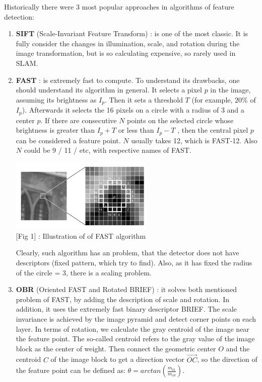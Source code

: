 Historically there were 3 most popular approaches in algorithms of feature detection:
\begin{enumerate}
    \item {\bf  SIFT} (Scale-Invariant Feature Transform) : is one of the most classic. It is fully consider the changes in illumination, scale, and rotation during the image transformation, but is so calculating expensive, so rarely used in SLAM.

    \item {\bf FAST} : is extremely fast to compute. To understand its drawbacks, one should understand its algorithm in general. It selects a  pixel $p$ in the image, assuming its brightness as $I_p$. Then it sets a threshold $T$ (for example, $20\%$ of $I_p$). Afterwards it selects the 16 pixels on a circle with a radius of 3 and a center $p$. If there are consecutive $N$ points on the selected circle whose brightness is greater than $I_p+T$ or less than $I_p−T$ , then the central pixel $p$ can be considered a feature point. $N$ usually takes 12, which is {\br FAST-12}. Also $N$ could be 9 / 11 / etc, with respective names of FAST.
    \begin{center}
        \includegraphics[height=3.5cm]{FAST_example.png}\\[1cm]
        [Fig 1] : Illustration of of FAST algorithm 
    \end{center}
    Clearly, such algorithm has an problem, that the detector does not have descriptors (fixed pattern, which try to find). Also, as it has fixed the radius of the circle = 3, there is a scaling problem.
    
    \item {\bf OBR}  (Oriented FAST and Rotated BRIEF) : it solves both mentioned problem of FAST, by adding the description of scale and rotation. In addition, it uses the extremely fast binary descriptor BRIEF. The scale invariance is achieved by the image pyramid and detect corner points on each layer. In terms of rotation, we calculate the gray centroid of the image near the feature point. The so-called centroid refers to the gray value of the image block as the center of weight. Then connect the geometric center $O$ and the centroid $C$ of the image block to get a direction vector $\overrightarrow{OC}$, so the direction of the feature point can be defined as: $\theta = arctan(\frac{m_{01}}{m_{10}})$.
\end{enumerate}

